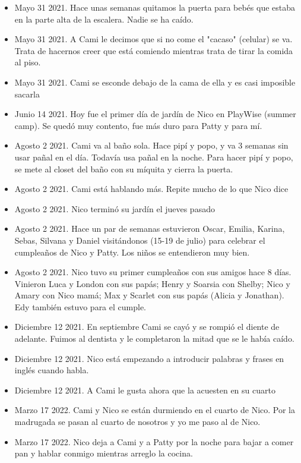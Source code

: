 \documentclass[12pt]{article}
\begin{document}
\begin{itemize}
  \item Mayo 31 2021. Hace unas semanas quitamos la puerta para beb\'es que estaba en la parte alta de la escalera. Nadie se ha ca\'ido.
  \item Mayo 31 2021. A Cami le decimos que si no come el "cacaso" (celular) se va. Trata de hacernos creer que est\'a comiendo mientras trata de tirar la comida al piso.
  \item Mayo 31 2021. Cami se esconde debajo de la cama de ella y es casi imposible sacarla
  \item Junio 14 2021. Hoy fue el primer d\'ia de jard\'in de Nico en PlayWise (summer camp). Se qued\'o muy contento, fue m\'as duro para Patty y para m\'i.
  \item Agosto 2 2021. Cami va al ba\~no sola. Hace pip\'i y popo, y va 3 semanas sin usar pa\~nal en el d\'ia. Todav\'ia usa pa\~nal en la noche. Para hacer pip\'i y popo, se mete al closet del ba\~no con su m\'iquita y cierra la puerta.
  \item Agosto 2 2021. Cami est\'a hablando m\'as. Repite mucho de lo que Nico dice
  \item Agosto 2 2021. Nico termin\'o su jard\'in el jueves pasado
  \item Agosto 2 2021. Hace un par de semanas estuvieron Oscar, Emilia, Karina, Sebas, Silvana y Daniel visit\'andonos (15-19 de julio) para celebrar el cumplea\~nos de Nico y Patty. Los ni\~nos se entendieron muy bien.
  \item Agosto 2 2021. Nico tuvo su primer cumplea\~nos con sus amigos hace 8 d\'ias. Vinieron Luca y London con sus pap\'as; Henry y Soarsia con Shelby; Nico y Amary con Nico mam\'a; Max y Scarlet con sus pap\'as (Alicia y Jonathan). Edy tambi\'en estuvo para el cumple.
  \item Diciembre 12 2021. En septiembre Cami se cay\'o y se rompi\'o el diente de adelante. Fuimos al dentista y le completaron la mitad que se le hab\'ia ca\'ido.
  \item Diciembre 12 2021. Nico est\'a empezando a introducir palabras y frases en ingl\'es cuando habla.
  \item Diciembre 12 2021. A Cami le gusta ahora que la acuesten en su cuarto
  \item Marzo 17 2022. Cami y Nico se est\'an durmiendo en el cuarto de Nico. Por la madrugada se pasan al cuarto de nosotros y yo me paso al de Nico.
  \item Marzo 17 2022. Nico deja a Cami y a Patty por la noche para bajar a comer pan y hablar conmigo mientras arreglo la cocina.

\end{itemize}
\end{document}

